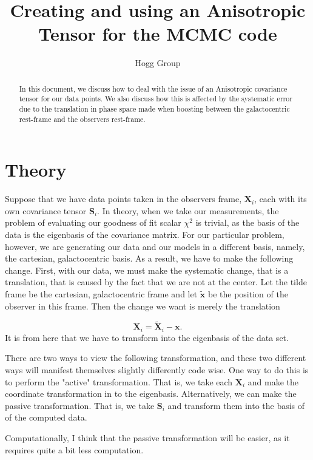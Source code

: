 \documentclass[12pt,preprint]{aastex}
\author{Hogg Group}
\title{Creating and using an Anisotropic Tensor for the MCMC code}
\date{}
\newcommand{\mtensor}[1]{\boldsymbol{#1}}
\newcommand{\mS}{\mtensor{S}}
\newcommand{\mvector}[1]{\mtensor{#1}}
\newcommand{\vx}{\mvector{x}}
\newcommand{\vX}{\mvector{X}}
\begin{document}
\begin{abstract}
In this document, we discuss how to deal with the issue of an Anisotropic covariance tensor for our data points. We also discuss how this is affected by the systematic error due to the translation in phase space made when boosting between the galactocentric rest-frame and the observers rest-frame. 
\end{abstract}

\maketitle

\section{Theory}

Suppose that we have data points taken in the observers frame, $\vX_i$, each with its own covariance tensor $\mS_i$. In theory, when we take our measurements, the problem of evaluating our goodness of fit scalar $\chi^2$ is trivial, as the basis of the data is the eigenbasis of the covariance matrix. For our particular problem, however, we are generating our data and our models in a different basis, namely, the cartesian, galactocentric basis. As a result, we have to make the following change. First, with our data, we must make the systematic change, that is a translation, that is caused by the fact that we are not at the center. Let the tilde frame be the cartesian, galactocentric frame and let $\tilde{\vx}$ be the position of the observer in this frame. Then the change we want is merely the translation

\begin{equation}
\vX_i = \tilde{\vX}_i - \vx.
\end{equation}
\noindent
It is from here that we have to transform into the eigenbasis of the data set. 

There are two ways to view the following transformation, and these two different ways will manifest themselves slightly differently code wise. One way to do this is to perform the "active" transformation. That is, we take each $\vX_i$ and make the coordinate transformation in to the eigenbasis. Alternatively, we can make the passive transformation. That is, we take $\mS_i$ and transform them into the basis of of the computed data.

Computationally, I think that the passive transformation will be easier, as it requires quite a bit less computation.
\end{document}
